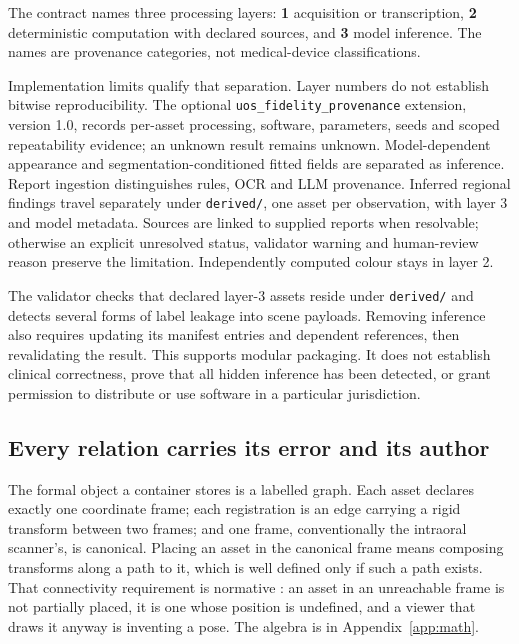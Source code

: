 \documentclass[11pt,a4paper]{article}
\newcommand{\code}[1]{\texttt{\small #1}}
\newenvironment{finding}[1]
 {\par\medskip\noindent{\color{uosblue}\rule{\linewidth}{0.9pt}}\par\nobreak\vspace{3pt}
  \noindent{\bfseries\color{uosblue}#1}\par\nobreak\vspace{2pt}}
 {\par\vspace{2pt}\noindent{\color{uosrule}\rule{\linewidth}{0.6pt}}\par\medskip}
\begin{document}
The contract names three processing layers: \textbf{1} acquisition or transcription,
\textbf{2} deterministic computation with declared sources, and \textbf{3} model inference.
The names are provenance categories, not medical-device classifications.

Implementation limits qualify that separation. Layer numbers do not establish
bitwise reproducibility. The optional \code{uos\_fidelity\_provenance} extension, version 1.0,
records per-asset processing, software, parameters, seeds and scoped repeatability evidence;
an unknown result remains unknown. Model-dependent appearance and segmentation-conditioned
fitted fields are separated as inference. Report ingestion distinguishes rules, OCR and LLM
provenance. Inferred regional findings travel separately under \code{derived/}, one
asset per observation, with layer 3 and model metadata. Sources are linked to supplied
reports when resolvable; otherwise an explicit unresolved status, validator warning and
human-review reason preserve the limitation. Independently computed colour stays in layer 2.

\begin{finding}{What removing inference does establish}
The validator checks that declared layer-3 assets reside under \code{derived/} and detects
several forms of label leakage into scene payloads. Removing inference also requires
updating its manifest entries and dependent references, then revalidating the result.
This supports modular packaging. It does not establish clinical correctness, prove that
all hidden inference has been detected, or grant permission to distribute or use software
in a particular jurisdiction.
\end{finding}

\subsection{Every relation carries its error and its author}\label{sec:relations}

The formal object a container stores is a labelled graph. Each asset declares exactly one
coordinate frame; each registration is an edge carrying a rigid transform between two
frames; and one frame, conventionally the intraoral scanner's, is canonical. Placing an
asset in the canonical frame means composing transforms along a path to it, which is well
defined only if such a path exists. That connectivity requirement is normative
\cite{uosspec}: an asset in an unreachable frame is not partially placed, it is one whose
position is undefined, and a viewer that draws it anyway is inventing a pose. The algebra is
in Appendix~\ref{app:math}.
\end{document}
